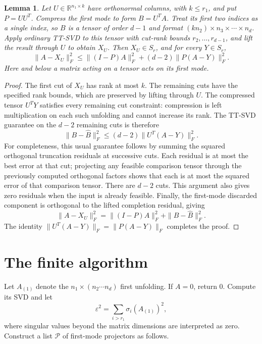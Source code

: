 \documentclass[11pt]{article}
\newtheorem{lemma}[theorem]{Lemma}
\newcommand{\R}{\mathbb R}
\begin{document}
\begin{lemma}\label{lem:completion}
Let $U\in\R^{n_1\times k}$ have orthonormal columns, with $k\le r_1$,
and put $P=UU^T$. Compress the first mode to form $B=U^T A$.
Treat its first two indices as a single index, so $B$ is a tensor of
order $d-1$ and format $(kn_2)\times n_3\times\cdots\times n_d$.
Apply ordinary TT-SVD to this tensor with cut-rank bounds
$r_2,\ldots,r_{d-1}$, and lift the result through $U$ to obtain $X_U$.
Then $X_U\in S_r$, and for every $Y\in S_r$,
\begin{equation}\label{eq:completion}
 \|A-X_U\|_F^2
 \le \|(I-P)A\|_F^2+(d-2)\|P(A-Y)\|_F^2.
\end{equation}
Here and below a matrix acting on a tensor acts on its first mode.
\end{lemma}
\begin{proof}
The first cut of $X_U$ has rank at most $k$. The remaining cuts have the
specified rank bounds, which are preserved by lifting through $U$.
The compressed tensor $U^TY$ satisfies every remaining cut constraint:
compression is left multiplication on each such unfolding and cannot
increase its rank. The TT-SVD guarantee on the $d-2$ remaining cuts is
therefore
\[
 \|B-\widehat B\|_F^2\le(d-2)\|U^T(A-Y)\|_F^2.
\]
For completeness, this usual guarantee follows by summing the squared
orthogonal truncation residuals at successive cuts. Each residual is at
most the best error at that cut; projecting any feasible comparison
tensor through the previously computed orthogonal factors shows that
each is at most the squared error of that comparison tensor. There are
$d-2$ cuts. This argument also gives zero residuals when the input is
already feasible.
Finally, the first-mode discarded component is orthogonal to the lifted
completion residual, giving
\[
 \|A-X_U\|_F^2=\|(I-P)A\|_F^2+\|B-\widehat B\|_F^2.
\]
The identity $\|U^T(A-Y)\|_F=\|P(A-Y)\|_F$ completes the proof.
\end{proof}

\section{The finite algorithm}
Let $A_{(1)}$ denote the $n_1\times(n_2\cdots n_d)$ first unfolding.
If $A=0$, return $0$. Compute its SVD and let
\[
 \varepsilon^2=\sum_{i>r_1}\sigma_i(A_{(1)})^2,
\]
where singular values beyond the matrix dimensions are interpreted as
zero. Construct a list $\mathcal P$ of first-mode projectors as follows.
\end{document}
